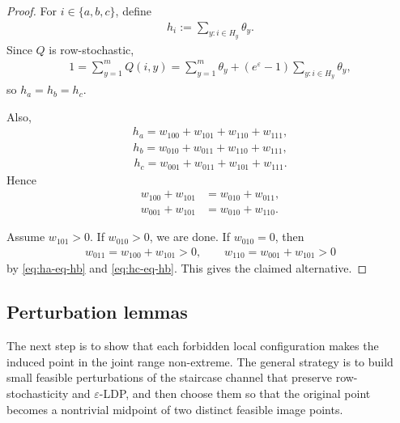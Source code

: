 \documentclass{article}
\theoremstyle{plain}
\theoremstyle{definition}
\theoremstyle{plain}
\begin{document}
\begin{proof}
For $i\in\{a,b,c\}$, define
\begin{align*}
    h_i:=\sum_{y:i\in H_y}\theta_y.
\end{align*}
Since $Q$ is row-stochastic,
\begin{align*}
    1=\sum_{y=1}^m Q(i,y) = \sum_{y=1}^m \theta_y + (e^\varepsilon-1)\sum_{y:i\in H_y}\theta_y,
\end{align*}
so $h_a=h_b=h_c$.

Also,
\begin{align*}
    h_a = w_{100}+w_{101}+w_{110}+w_{111},
\end{align*}
\begin{align*}
    h_b = w_{010}+w_{011}+w_{110}+w_{111},
\end{align*}
\begin{align*}
    h_c = w_{001}+w_{011}+w_{101}+w_{111}.
\end{align*}
Hence
\begin{align}
    w_{100}+w_{101} &= w_{010}+w_{011}, \label{eq:ha-eq-hb}\\
    w_{001}+w_{101} &= w_{010}+w_{110}. \label{eq:hc-eq-hb}
\end{align}

Assume $w_{101}>0$. If $w_{010}>0$, we are done. If $w_{010}=0$, then
\begin{align*}
    w_{011}=w_{100}+w_{101}>0,
    \qquad
    w_{110}=w_{001}+w_{101}>0
\end{align*}
by \eqref{eq:ha-eq-hb} and \eqref{eq:hc-eq-hb}. This gives the claimed alternative.
\end{proof}


\subsection{Perturbation lemmas}
\label{sec:perturbation-lemmas}
The next step is to show that each forbidden local configuration makes the induced point in the joint range non-extreme. The general strategy is to build small feasible perturbations of the staircase channel that preserve row-stochasticity and $\varepsilon$-LDP, and then choose them so that the original point becomes a nontrivial midpoint of two distinct feasible image points.
\end{document}
